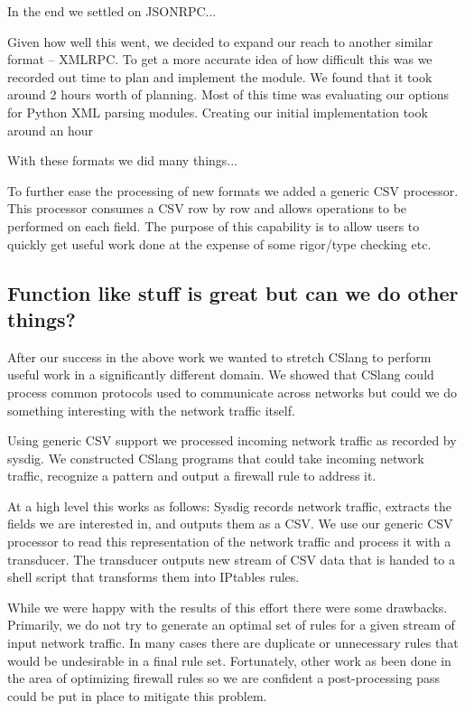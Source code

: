 In the end we settled on JSONRPC...


Given how well this went, we decided to expand our reach to another similar
format -- XMLRPC.  To get a more accurate idea of how difficult this was we
recorded out time to plan and implement the module.  We found that it took
around 2 hours
worth of planning.  Most of this time was evaluating our options for
Python XML parsing modules.
Creating our initial implementation took around an hour

With these formats we did many things...


To further ease the processing of new formats we added a generic CSV
processor.  This processor consumes a CSV row by row and allows operations
to be performed on each field.  The purpose of this capability is to allow
users to quickly get useful work done at the expense of some rigor/type
checking etc.


\subsection{Function like stuff is great but can we do other things?}

After our success in the above work we wanted to stretch CSlang to perform
useful work in a significantly different domain.  We showed that CSlang
could process common protocols used to communicate across networks but
could we do something interesting with the network traffic itself.

Using generic CSV support we processed incoming network traffic as recorded
by sysdig.  We constructed CSlang programs that could take incoming network
traffic, recognize a pattern and output a firewall rule to address it.

At a high level this works as follows:
Sysdig records network traffic, extracts the fields we are interested in,
and outputs them as a CSV.  We use our generic CSV processor to read this
representation of the network traffic and process it with a transducer.
The transducer outputs new stream of CSV data that is handed to a shell
script that transforms them into IPtables rules.

While we were happy with the results of this effort there were some
drawbacks.  Primarily, we do not try to generate an optimal set of rules
for a given stream of input network traffic.  In many cases there are
duplicate or unnecessary rules that would be undesirable in a final rule
set.  Fortunately, other work as been done in the area of optimizing
firewall rules so we are confident a post-processing pass could be put in
place to mitigate this problem.


